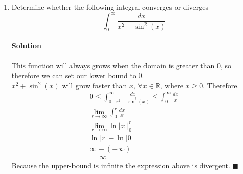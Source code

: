 \documentclass[MATH-115-Notes.tex]{subfiles}
\begin{document}
\begin{enumerate}
    \paragraph*{Solution}
    \begin{gather*}
        \text{The recurrence equation is } f(x) = \frac{Cx^2}{4}\\
        \int_{0}^{1} \frac{Cx^2}{4}dx = 2\\
        \frac{Cx^3}{12} \Big|_0^1 = 2\\
        \frac{C}{12} - 0 = 2\\
        C = 24\\ 
        \int_{1/2}^{1}6x^2dx\\
        2x^3 \Big|_{1/2}^1 = 2 - \frac{1}{4}\\
        = \frac{7}{4}
    \end{gather*}
    \begin{commentbox}{Note}
        I'm not too sure if this is the correct answer. Wolfram Alpha stated that this expression $f(2x) = 4f(x)$ is a recurrence equation of \[f(x) = \frac{Cx^2}{4}.\] Which kinda makes sense as you double the domain you quadruple the range, it looks like a quadratic relationship.
    \end{commentbox}
        



    \item Determine whether the following integral converges or diverges \[\int_{0}^{\infty}\frac{dx}{x^2+\sin^2(x)}\]
    \paragraph*{Solution}
    This function will always grows when the domain is greater than 0, so therefore we can set our lower bound to 0.\\
    \(x^2 + \sin^2(x)\) will grow faster than \(x,\ \forall x\in \mathbb{R},\ \text{where } x \geq 0\). Therefore.
    \begin{gather*}
        0 \leq \int_{0}^{\infty}\frac{dx}{x^2+\sin^2(x)} \leq \int_{0}^{\infty} \frac{dx}{x}\\
        \lim_{r \to \infty} \int_{0}^{r} \frac{dx}{x}\\
        \lim_{r \to \infty} \ln|x|\Big|_0^r\\
        \ln|r| - \ln|0|\\
        \infty - (-\infty)\\
        = \infty
    \end{gather*}
    Because the upper-bound is infinite the expression above is divergent. $\blacksquare$


\end{enumerate}
\end{document}
